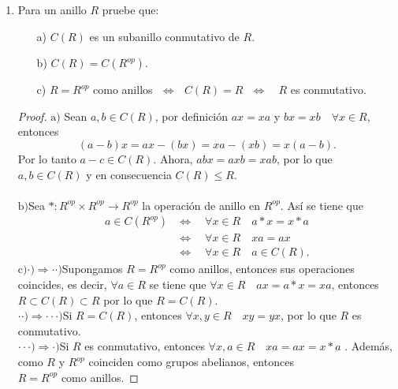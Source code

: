 \documentclass{article}
\theoremstyle{definition}
\theoremstyle{plain}
\theoremstyle{plain}
\theoremstyle{definition}
\theoremstyle{definition}
\theoremstyle{definition}
\theoremstyle{definition}
\theoremstyle{definition}
\theoremstyle{definition}
\begin{document}
\begin{enumerate}[label=\textbf{Ej \arabic*.}]
		\item
		Para un anillo $R$ pruebe que: 
		\begin{itemize}
			\item[a)] $C(R)$ es un subanillo conmutativo de $R$.
			\item[b)] $C(R)=C(R^{op})$.
			\item[c)] $R=R^{op}$ como anillos\,\, $\Leftrightarrow$ \,\,$C(R)=R$\,\, $\Leftrightarrow$ \,\, $R$ es conmutativo.
		\end{itemize}
		
		\begin{proof}
			$\boxed{\text{a)}}$ \quad Sean $a,b\in C(R)$, por definición $ax=xa$ y $bx=xb\quad\forall x\in R$, entonces
			\[(a-b)x=ax-(bx)=xa-(xb)=x(a-b).\]
			Por lo tanto $a-c\in C(R)$. Ahora, $abx=axb=xab$, por lo que $a,b\in C(R)$ y en consecuencia $C(R)\leq R$.\\\\
			$\boxed{\text{b)}}$\quad Sea $*:R^{op}\times R^{op}\to R^{op}$ la operación de anillo en $R^{op}$. Así se tiene que 
			\begin{align*}
				a\in C(R^{op})
				&\Leftrightarrow\quad  \forall x\in R\quad a*x=x*a \\
				& \Leftrightarrow\quad \forall x\in R\quad xa=ax\\
				&\Leftrightarrow\quad \forall x\in R\quad a\in C(R).
			\end{align*}
			$\boxed{\text{c)}}$\quad $\boxed{\cdot)\Rightarrow \cdot\cdot)}$\quad Supongamos $R=R^{op}$ como anillos, 
			entonces sus operaciones coincides, es decir,
			$\forall a\in R$ se tiene que $\forall x\in R\quad ax=a*x=xa$, entonces $R\subset C(R)\subset R$ por lo que $R=C(R)$.\\
			
			$\boxed{\cdot\cdot)\Rightarrow \cdot\cdot\cdot)}$\quad Si $R=C(R)$, entonces $\forall x,y\in R\quad xy=yx$, por lo que
			$R$ es conmutativo.\\
			
			$\boxed{\cdot\cdot\cdot)\Rightarrow \cdot)}$\quad Si $R$ es conmutativo, entonces $\forall x,a\in R\quad xa=ax=x*a$ .
			Además, como $R$ y $R^{op}$ coinciden como grupos abelianos, entonces \\
			$R=R^{op}$ como anillos.
		\end{proof}
		

\end{enumerate}
\end{document}
